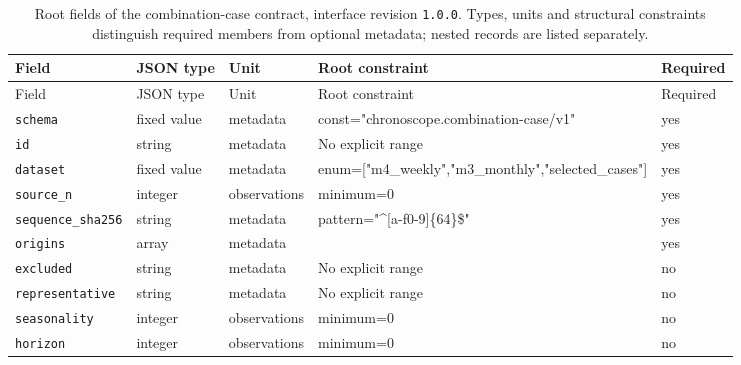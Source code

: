 \begingroup\small
\begin{longtable}{@{}p{}p{}p{}p{}p{}@{}}
\caption{Root fields of the combination-case contract, interface revision \texttt{1.0.0}. Types, units and structural constraints distinguish required members from optional metadata; nested records are listed separately.}\label{tab:contract-combination-case}\\
\toprule Field & JSON type & Unit & Root constraint & Required\\\midrule\endfirsthead
\toprule Field & JSON type & Unit & Root constraint & Required\\\midrule\endhead
\texttt{schema} & fixed value & metadata & const="chronosco\allowbreak{}pe.combination-c\allowbreak{}ase/v1" & yes\\
\texttt{id} & string & metadata & No explicit range & yes\\
\texttt{dataset} & fixed value & metadata & enum=["m4\_\allowbreak{}weekly","m3\_\allowbreak{}monthly","selected\_\allowbreak{}cases"] & yes\\
\texttt{source\_\allowbreak{}n} & integer & observations & minimum=0 & yes\\
\texttt{sequence\_\allowbreak{}sha256} & string & metadata & pattern="\textasciicircum{}[a-f0-9]\{64\}\$" & yes\\
\texttt{origins} & array & metadata &  & yes\\
\texttt{excluded} & string & metadata & No explicit range & no\\
\texttt{representative} & string & metadata & No explicit range & no\\
\texttt{seasonality} & integer & observations & minimum=0 & no\\
\texttt{horizon} & integer & observations & minimum=0 & no\\
\bottomrule
\end{longtable}
\endgroup
